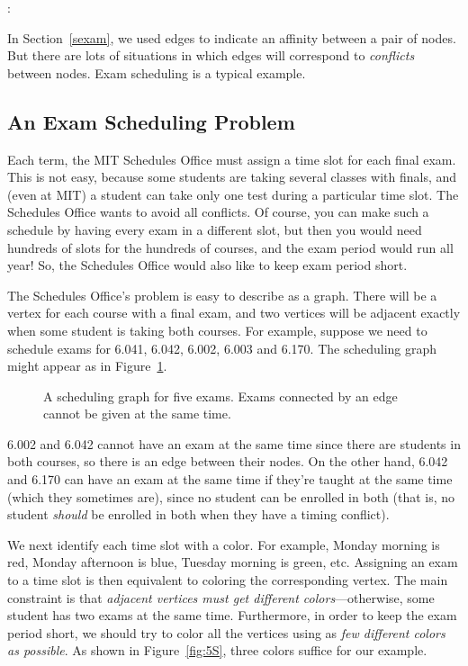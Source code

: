 \begin{editingnotes}
:
\end{editingnotes}

In Section~\ref{sexam}, we used edges to indicate an affinity between a
pair of nodes.  But there are lots of situations in which edges will
correspond to \emph{conflicts} between nodes.  Exam scheduling is a
typical example.

\subsection{An Exam Scheduling Problem}

Each term, the MIT Schedules Office must assign a time slot for each
final exam.  This is not easy, because some students are taking
several classes with finals, and (even at MIT) a student can take only
one test during a particular time slot.  The Schedules Office wants to
avoid all conflicts.  Of course, you can make such a schedule by
having every exam in a different slot, but then you would need
hundreds of slots for the hundreds of courses, and the exam period
would run all year!  So, the Schedules Office would also like to keep
exam period short.

The Schedules Office's problem is easy to describe as a graph.  There
will be a vertex for each course with a final exam, and two vertices
will be adjacent exactly when some student is taking both courses.
For example, suppose we need to schedule exams for 6.041, 6.042,
6.002, 6.003 and 6.170.  The scheduling graph might appear as in
Figure~\ref{fig:5R}.

\begin{figure}


\caption{A scheduling graph for five exams.  Exams connected by an
  edge cannot be given at the same time.}

\label{fig:5R}

\end{figure}

6.002 and 6.042 cannot have an exam at the same time since there are
students in both courses, so there is an edge between their nodes.  On the
other hand, 6.042 and 6.170 can have an exam at the same time if they're
taught at the same time (which they sometimes are), since no student can
be enrolled in both (that is, no student \emph{should} be enrolled in both
when they have a timing conflict).

We next identify each time slot with a color.  For example, Monday
morning is red, Monday afternoon is blue, Tuesday morning is green,
etc.  Assigning an exam to a time slot is then equivalent to coloring
the corresponding vertex.  The main constraint is that \emph{adjacent
  vertices must get different colors}---otherwise, some student has
two exams at the same time.  Furthermore, in order to keep the exam
period short, we should try to color all the vertices using as
\emph{few different colors as possible}.  As shown in Figure~\ref{fig:5S},
three colors suffice for our example.

